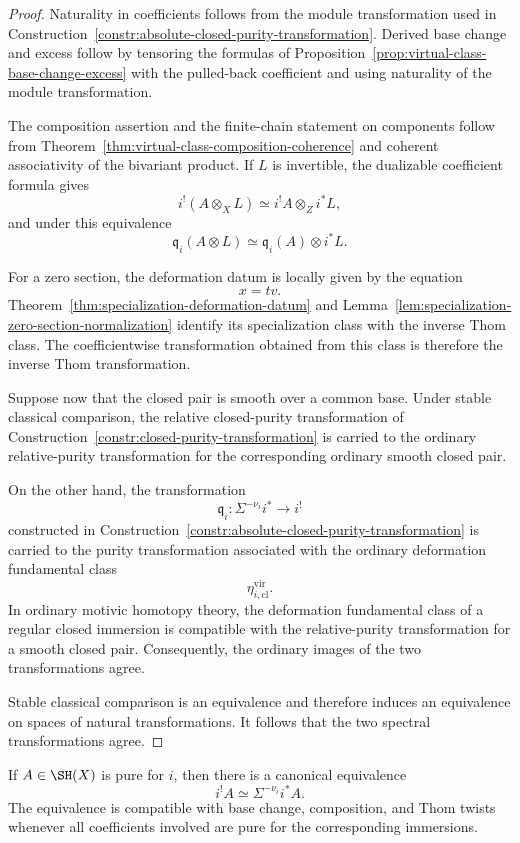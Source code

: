 \begin{proof}
Naturality in coefficients follows from the module transformation used in
Construction~\ref{constr:absolute-closed-purity-transformation}.  Derived
base change and excess follow by tensoring the formulas of
Proposition~\ref{prop:virtual-class-base-change-excess} with the pulled-back
coefficient and using naturality of the module transformation.

The composition assertion and the finite-chain statement on components
follow from
Theorem~\ref{thm:virtual-class-composition-coherence} and coherent
associativity of the bivariant product.  If \(L\) is invertible, the
dualizable coefficient formula gives
\[
    i^!(A\otimes_XL)
    \simeq
    i^!A\otimes_Zi^*L,
\]
and under this equivalence
\[
    \mathfrak q_i(A\otimes L)
    \simeq
    \mathfrak q_i(A)\otimes i^*L.
\]

For a zero section, the deformation datum is locally given by the equation
\[
    x=tv.
\]
Theorem~\ref{thm:specialization-deformation-datum} and
Lemma~\ref{lem:specialization-zero-section-normalization}
identify its specialization class with the inverse Thom class.  The
coefficientwise transformation obtained from this class is therefore the
inverse Thom transformation.

Suppose now that the closed pair is smooth over a common base.  Under
stable classical comparison, the relative closed-purity transformation of
Construction~\ref{constr:closed-purity-transformation} is carried to the
ordinary relative-purity transformation for the corresponding ordinary
smooth closed pair.

On the other hand, the transformation
\[
    \mathfrak q_i:
    \Sigma^{-\nu_i}i^*
    \longrightarrow
    i^!
\]
constructed in
Construction~\ref{constr:absolute-closed-purity-transformation}
is carried to the purity transformation associated with the ordinary
deformation fundamental class
\[
    \eta^{\mathrm{vir}}_{i,\mathrm{cl}}.
\]
In ordinary motivic homotopy theory, the deformation fundamental class of a
regular closed immersion is compatible with the relative-purity
transformation for a smooth closed pair.  Consequently, the ordinary images
of the two transformations agree.

Stable classical comparison is an equivalence and therefore induces an
equivalence on spaces of natural transformations.  It follows that the two
spectral transformations agree.
\end{proof}

\begin{corollary}
\label{cor:closed-purity-pure-coefficients}
If \(A\in\SH(X)\) is pure for \(i\), then there is a canonical equivalence
\[
    i^!A
    \simeq
    \Sigma^{-\nu_i}i^*A.
\]
The equivalence is compatible with base change, composition, and Thom
twists whenever all coefficients involved are pure for the corresponding
immersions.
\end{corollary}

